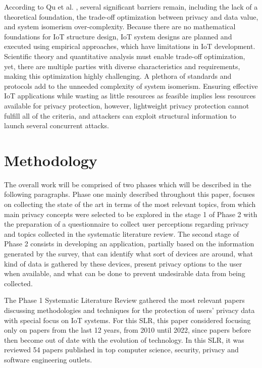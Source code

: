 \documentclass[manuscript,natbib=false]{acmart}
\begin{document}
According to Qu et al. \cite{Qu2018Privacy}, several significant barriers
remain, including the lack of a theoretical foundation, the trade-off optimization
between privacy and data value, and system isomerism over-complexity. Because
there are no mathematical foundations for IoT structure design, IoT system
designs are planned and executed using empirical approaches, which have
limitations in IoT development. Scientific theory and quantitative analysis
must enable trade-off optimization, yet, there are multiple parties with
diverse characteristics and requirements, making this optimization highly
challenging. A plethora of standards and protocols add to the unneeded complexity
of system isomerism. Ensuring effective IoT applications while wasting as
little resources as feasible implies less resources available for privacy
protection, however, lightweight privacy protection cannot fulfill all of
the criteria, and attackers can exploit structural information to launch
several concurrent attacks.

\section{Methodology}

The overall work will be comprised of two phases which will be described
in the following paragraphs. Phase one mainly described throughout this
paper, focuses on collecting the state of the art in terms of the most relevant
topics, from which main privacy concepts were selected to be explored in
the stage 1 of Phase 2 with the preparation of a questionnaire to collect
user perceptions regarding privacy and topics collected in the systematic
literature review. The second stage of Phase 2 consists in developing an
application, partially based on the information generated by the survey,
that can identify what sort of devices are around, what kind of data is
gathered by these devices, present privacy options to the user when available,
and what can be done to prevent undesirable data from being collected.
\par
The Phase 1 Systematic Literature Review gathered the most relevant papers
discussing methodologies and techniques for the protection of users' privacy
data with special focus on IoT systems. For this SLR, this paper considered
focusing only on papers from the last 12 years, from 2010 until 2022, since
papers before then become out of date with the evolution of technology.
In this SLR, it was reviewed 54 papers published in top computer science,
security, privacy and software engineering outlets.
\end{document}
